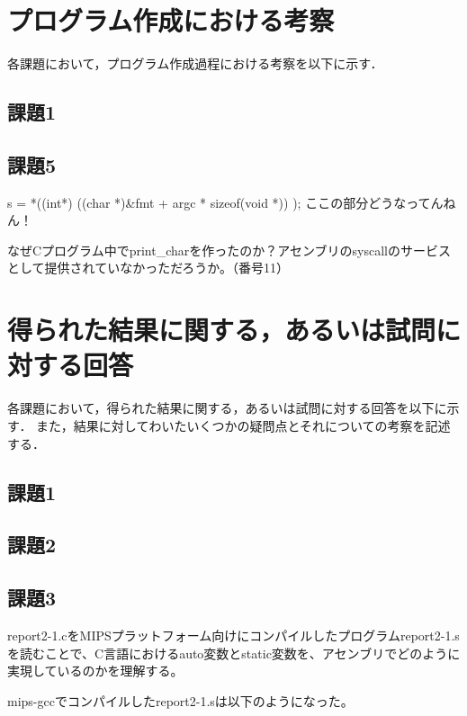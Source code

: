 \documentclass[a4j]{jarticle}
\begin{document}



%
%

\section{プログラム作成における考察}

各課題において，プログラム作成過程における考察を以下に示す．

\subsection{課題1}


\subsection{課題5}


s = *((int*) ((char *)\&fmt + argc * sizeof(void *)) ); ここの部分どうなってんねん！

なぜCプログラム中でprint\_charを作ったのか？アセンブリのsyscallのサービスとして提供されていなかっただろうか。（番号11）




%
%

\section{得られた結果に関する，あるいは試問に対する回答}


各課題において，得られた結果に関する，あるいは試問に対する回答を以下に示す．
また，結果に対してわいたいくつかの疑問点とそれについての考察を記述する．


\subsection{課題1}
\subsection{課題2}
\subsection{課題3}

report2-1.cをMIPSプラットフォーム向けにコンパイルしたプログラムreport2-1.sを読むことで、C言語におけるauto変数とstatic変数を、アセンブリでどのように実現しているのかを理解する。

mips-gccでコンパイルしたreport2-1.sは以下のようになった。
\end{document}
